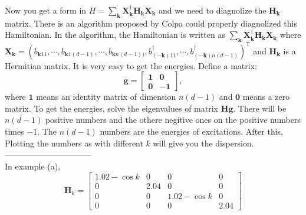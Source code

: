 \documentclass[letterpaper,10pt]{article}
\begin{document}
Now you get a form in $H=\sum_{\bm{k}}\mathbf{X}^{\dagger}_{\bm{k}}\mathbf{H}_{\bm{k}}\mathbf{X}_{\bm{k}}$ and we need to diagnolize the $\mathbf{H}_{\bm{k}}$ matrix. There is an algorithm proposed by Colpa could properly diagnolized this Hamiltonian. In the algorithm, the Hamiltonian is written as $\sum_{\bm{k}}\mathbf{X}^{\dagger}_{\bm{k}}\mathbf{H}_{\bm{k}}\mathbf{X}_{\bm{k}}$ where $\mathbf{X}_{\bm{k}}=\left(b_{\bm{k}11},\cdots,b_{\bm{k}1(d-1)},\cdots,b_{\bm{k}n(d-1))},b_{(-\bm{k})11}^{\dagger},\cdots,b_{(-\bm{k})n(d-1)}^{\dagger}\right)^{\mathsf{T}}$ and $\mathbf{H}_{\bm{k}}$ is a Hermitian matrix. It is very easy to get the energies. Define a matrix:$$
\mathbf{g}=\begin{bmatrix}
    \mathbf{1} & \mathbf{0}  \\
    \mathbf{0} &  -\mathbf{1}
    \end{bmatrix},
$$
where $\mathbf{1}$ means an identity matrix of dimension $n(d-1)$ and $\mathbf{0}$ means a zero matrix. To get the energies, solve the eigenvalues of matrix $\mathbf{H}\mathbf{g}$. There will be $n(d-1)$ positive numbers and the othere negitive ones on the positive numbers times $-1$. The $n(d-1)$ numbers are the energies of excitations. After this, Plotting the numbers as with different $k$ will give you the dispersion. \\
--------------------------------\\
In example (a), $$
\mathbf{H}_{k}=\begin{bmatrix}
    1.02-\cos k & 0 & 0 & 0 \\
    0 &  2.04 & 0 &0 \\
    0 &  0 & 1.02-\cos k &0\\
    0 & 0 & 0& 2.04
\end{bmatrix}$$
\end{document}
